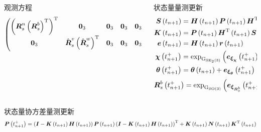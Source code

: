 \begin{frame}
\begin{columns}[t]
\begin{column}{0.5\textwidth}
\begin{block}{观测方程}
{{{\begin{align*}
\begin{pmatrix}
								\left(\vb*{R}_s^n \left(\vb*{R}_{s}^b\right)^{\mathrm{T}}\right)^{\mathrm{T}} & \vb*{0}_3 & \vb*{0}_3 & \vb*{0}_3 & \vb*{0}_3 & -\vb*{I}_3 \\
								\vb*{0}_3 & \hat{\vb*{R}}_s^v \left(\hat{\vb*{R}}_s^w\right)^{\mathrm{T}} & \vb*{0}_3 & \vb*{0}_3 & \vb*{0}_3 & -\left( \hat{\vb*{R}}_s^v \left(\hat{\vb*{R}}_s^w\right)^{\mathrm{T}} \hat{\vb*{v}}_s^w \right)_{\times}
							\end{pmatrix}
						\end{align*}
					}
		   		}}
			\end{block}
		\end{column}   
		\begin{column}{0.5\textwidth}
			\begin{block}{状态量量测更新}
			\vspace{-0.5cm}
			{
				\tiny	
				\begin{align*}
			    	\vb*{S}\left(t_{n+1}\right) &= \vb*{H}\left(t_{n+1}\right) \vb*{P}\left(t_{n+1}\right) \vb*{H}^{\mathrm{T}}\left(t_{n+1}\right) + \vb*{N}\left(t_{n+1}\right) \\
			    	\vb*{K}\left(t_{n+1}\right) &= \vb*{P}\left(t_{n+1}\right) \vb*{H}^{\mathrm{T}}\left(t_{n+1}\right) \vb*{S}^{-1}\left(t_{n+1}\right) \\
				    \vb*{e}\left(t_{n+1}\right) &= \vb*{H}\left(t_{n+1}\right) \vb*{r}\left(t_{n+1}\right) \\
					\vb*{\chi}\left(t_{n+1}^+\right)   &= \exp_{\mathrm{G}_{\mathrm{SE}_2\left(3\right)}}\left( \vb*{e}_{\vb*{\xi}_{\vb*{\chi}}}\left(t_{n+1}^+\right) \right) \vb*{\chi}\left(t_{n+1}\right)\\
					\vb*{\theta}\left(t_{n+1}^+\right) &= \vb*{\theta}\left(t_{n+1}\right) + \vb*{e}_{\vb*{\xi}_{\vb*{\theta}}}\left(t_{n+1}^+\right)
				\end{align*}
			}
			\vspace{-1.0cm}
			{
				\scriptsize	
				\begin{align*}
					\vb*{R}_s^b\left(t_{n+1}^+\right)  &= \exp_{\mathrm{G}_{\mathrm{SO}\left(3\right)}}\left( \vb*{e}_{\vb*{\xi}_{\vb*{R}_s^b}}\left(t_{n+1}^+\right) \right) \vb*{R}_s^b\left(t_{n+1}\right)
				\end{align*}
			}
			\end{block} 
		\end{column}
	\end{columns} 
	\begin{block}{状态量协方差量测更新}
		{\scriptsize%
			\begin{equation*}
				\vb*{P}\left(t_{n+1}^+\right) = \left(\vb*{I} - \vb*{K}\left(t_{n+1}\right)\vb*{H}\left(t_{n+1}\right)\right) \vb*{P}\left(t_{n+1}\right) \left(\vb*{I} - \vb*{K}\left(t_{n+1}\right)\vb*{H}\left(t_{n+1}\right)\right)^{\mathrm{T}} + \vb*{K}\left(t_{n+1}\right)\vb*{N}\left(t_{n+1}\right) \vb*{K}^{\mathrm{T}}\left(t_{n+1}\right)
			\end{equation*}
		}
	\end{block} 
\end{frame}

